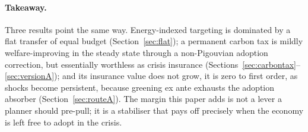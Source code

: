\paragraph{Takeaway.} Three results point the same way. Energy-indexed targeting
is dominated by a flat transfer of equal budget (Section~\ref{sec:flat}); a
permanent carbon tax is mildly welfare-improving in the steady state through a
non-Pigouvian adoption correction, but essentially worthless as crisis insurance
(Sections~\ref{sec:carbontax}--\ref{sec:versionA}); and its insurance value does not
grow, it is zero to first order, as shocks become persistent, because greening
ex ante exhausts the adoption absorber (Section~\ref{sec:routeA}). The margin this paper adds is not a
lever a planner should pre-pull; it is a stabiliser that pays off precisely when
the economy is left free to adopt in the crisis.
